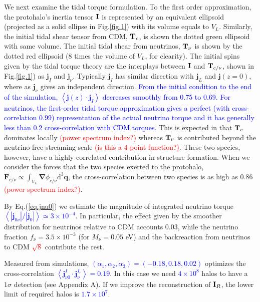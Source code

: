 \documentclass[aps,prd,twocolumn,amsmath,amssymb,amsfont,superscriptaddress]{revtex4-1}
\newcommand{\bs}{\boldsymbol}
\newcommand{\diff}{{\mathrm d}}
\newcommand{\tcb}{\textcolor{blue}}
\newcommand{\tcr}{\textcolor{red}}
\begin{document}
We next examine the tidal torque formulation. To the first order approximation, the protohalo's inertia tensor $\bold{I}$ is represented by an equivalent ellipsoid (projected as a solid ellipse in Fig.\ref{fig.1}) with its volume equals to $V_L$.
Similarly, the initial tidal shear tensor from CDM, $\bold{T}_c$, is shown the dotted green ellipsoid with same volume. 
The initial tidal shear from neutrinos, $\bold{T}_\nu$ is shown by the dotted red ellipsoid (8 times the volume of $V_L$, for clearity). 
The initial spins given by the tidal torque theory are the interplays between $\bold{I}$ and $\bold{T}_{c/\nu}$, shown in Fig.\ref{fig.1}) as $\bs{j}_I$ and $\bs{j}_\nu$. 
Typically $\bs{j}_I$ has similar direction with $\bs{j}_L$ and $\bs{j}(z=0)$, where as $\bs{j}_\nu$ gives an independent direction. \tcb{From the initial condition to the end of the simulation, $\left\langle \bs{j}(z) \cdot \bs{j}_I \right\rangle$ decreases smoothly from 0.75 to 0.69. For neutrinos, the first-order tidal torque approximation gives a perfect (with cross-correlation 0.99) representation of the actual neutrino torque and it has generally less than 0.2 cross-correlation with CDM torques.} This is expected in that $\bold{T}_c$ dominates locally \tcr{(power spectrum index?)} whereas $\bold{T}_\nu$ is contributed beyond the neutrino free-streaming scale \tcr{(is this a 4-point function?)}. These two species, however, have a highly correlated contribution in structure formation. When we consider the forces that the two species exerted to the protohalo, $\bs{F}_{c/\nu}\propto\int_{V_L}\bs{\nabla}\phi_{c/\nu}\diff^3\bs{q}$, the cross-correlation between two species is as high as 0.86 \tcr{(power spectrum index?)}.

By Eq.(\ref{eq.jnu0}) we estimate the magnitude of integrated neutrino torque \tcb{$\left\langle|\bs{j}_{0\nu}|/|\bs{j}_0|\right\rangle\simeq 3\times10^{-4}$}. In particular, the effect given by the smoother distribution for neutrinos relative to CDM accounts 0.03, while the neutrino fraction $f_\nu=3.5\times 10^{-3}$ (for $M_\nu=0.05$ eV) and the backreaction from neutrinos to CDM \tcr{$\sqrt{8}$} contribute the rest.

Measured from simulations, \tcb{$(\alpha_1,\alpha_2,\alpha_3)=(-0.18,0.18,0.02)$} optimizes the cross-correlation \tcb{$\left\langle\bs{j}^I_{\nu 0}\cdot\bs{j}^{I_r}_\nu\right\rangle=0.19$}. In this case we need \tcb{$4\times 10^8$} halos to have a $1\sigma$ detection (see Appendix A). If we improve the reconstruction of $\bold{I}_R$, the lower limit of required halos is \tcb{$1.7\times 10^7$}. 
\end{document}
